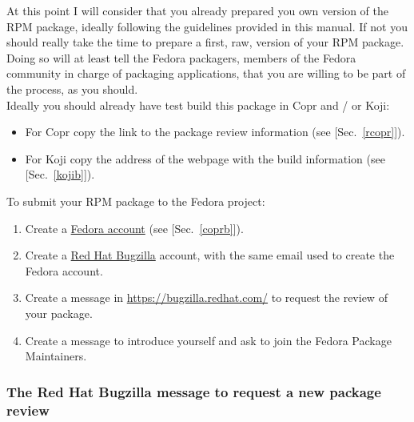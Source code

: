 At this point I will consider that you already prepared you own version of the RPM package, ideally following the guidelines provided in this manual. 
If not you should really take the time to prepare a first, raw, version of your RPM package. 
Doing so will at least tell the Fedora packagers, members of the Fedora community 
in charge of packaging applications, that you are willing to be part of the process, as you should. \\[0.25cm]
Ideally you should already have test build this package in Copr and / or Koji:
\begin{itemize}
\item For Copr copy the link to the package review information (see [Sec.~\ref{rcopr}]).
\item For Koji copy the address of the webpage with the build information (see [Sec.~\ref{kojib}]). 
\end{itemize}
To submit your RPM package to the Fedora project:
\begin{enumerate}
\item Create a \href{https://accounts.fedoraproject.org/}{Fedora account} (see [Sec.~\ref{coprb}]).
\item Create a \href{https://bugzilla.redhat.com}{Red Hat Bugzilla} account, with the same email used to create the Fedora account. 
\item Create a message in \href{https://bugzilla.redhat.com/}{https://bugzilla.redhat.com/} to request the review of your package. 
\item Create a message to introduce yourself and ask to join the Fedora Package Maintainers.
\end{enumerate}

\subsubsection{The Red Hat Bugzilla message to request a new package review}

